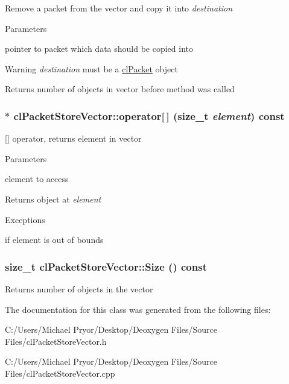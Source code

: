 \label{classcl_packet_store_vector_a1166335dc4abb21918e4d3df80032ff0}
Remove a packet from the vector and copy it into {\itshape destination\/} 
\begin{DoxyParams}{Parameters}
\item[{\em destination}]pointer to packet which data should be copied into \end{DoxyParams}
\begin{DoxyWarning}{Warning}
{\itshape destination\/} must be a \hyperlink{classcl_packet}{clPacket} object 
\end{DoxyWarning}
\begin{DoxyReturn}{Returns}
number of objects in vector before method was called 
\end{DoxyReturn}
\hypertarget{classcl_packet_store_vector_a67f63c94d0898cdfafffd59dff28407e}{
\subsubsection[{operator[]}]{ $\ast$ clPacketStoreVector::operator\mbox{[}$\,$\mbox{]} (size\_\-t {\em element}) const}}
\label{classcl_packet_store_vector_a67f63c94d0898cdfafffd59dff28407e}
\mbox{[}\mbox{]} operator, returns element in vector 
\begin{DoxyParams}{Parameters}
\item[{\em element}]element to access \end{DoxyParams}
\begin{DoxyReturn}{Returns}
object at {\itshape element\/} 
\end{DoxyReturn}

\begin{DoxyExceptions}{Exceptions}
\item[{\em \hyperlink{structcl_error}{clError}}]if element is out of bounds \end{DoxyExceptions}
\hypertarget{classcl_packet_store_vector_ab926455abbf6e03326a5c75238cde1c5}{
\subsubsection[{Size}]{\setlength{\rightskip}{0pt plus 5cm}size\_\-t clPacketStoreVector::Size () const}}
\label{classcl_packet_store_vector_ab926455abbf6e03326a5c75238cde1c5}
\begin{DoxyReturn}{Returns}
number of objects in the vector 
\end{DoxyReturn}


The documentation for this class was generated from the following files:\begin{DoxyCompactItemize}
\item 
C:/Users/Michael Pryor/Desktop/Deoxygen Files/Source Files/clPacketStoreVector.h\item 
C:/Users/Michael Pryor/Desktop/Deoxygen Files/Source Files/clPacketStoreVector.cpp\end{DoxyCompactItemize}
